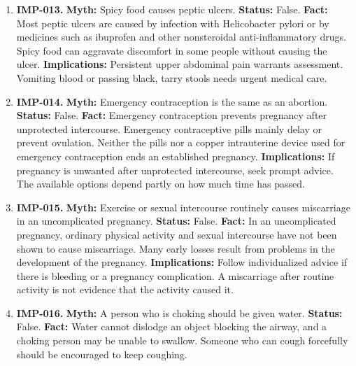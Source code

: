 \documentclass[11pt,oneside]{book}
\begin{document}
\begin{enumerate}[leftmargin=0pt,labelwidth=0pt,labelsep=0pt,itemindent=0pt]
\textbf{Implications:} Consider therapy when distress affects everyday life or when structured support could help you work toward a specific goal.
\item[] \textbf{IMP-013.} \textbf{Myth:} Spicy food causes peptic ulcers.\newline
\textbf{Status:} False.\newline
\textbf{Fact:} Most peptic ulcers are caused by infection with Helicobacter pylori or by medicines such as ibuprofen and other nonsteroidal anti-inflammatory drugs. Spicy food can aggravate discomfort in some people without causing the ulcer. \cite{ref401}\newline
\textbf{Implications:} Persistent upper abdominal pain warrants assessment. Vomiting blood or passing black, tarry stools needs urgent medical care.
\item[] \textbf{IMP-014.} \textbf{Myth:} Emergency contraception is the same as an abortion.\newline
\textbf{Status:} False.\newline
\textbf{Fact:} Emergency contraception prevents pregnancy after unprotected intercourse. Emergency contraceptive pills mainly delay or prevent ovulation. Neither the pills nor a copper intrauterine device used for emergency contraception ends an established pregnancy. \cite{ref402}\newline
\textbf{Implications:} If pregnancy is unwanted after unprotected intercourse, seek prompt advice. The available options depend partly on how much time has passed.
\item[] \textbf{IMP-015.} \textbf{Myth:} Exercise or sexual intercourse routinely causes miscarriage in an uncomplicated pregnancy.\newline
\textbf{Status:} False.\newline
\textbf{Fact:} In an uncomplicated pregnancy, ordinary physical activity and sexual intercourse have not been shown to cause miscarriage. Many early losses result from problems in the development of the pregnancy. \cite{ref254,ref403}\newline
\textbf{Implications:} Follow individualized advice if there is bleeding or a pregnancy complication. A miscarriage after routine activity is not evidence that the activity caused it.
\item[] \textbf{IMP-016.} \textbf{Myth:} A person who is choking should be given water.\newline
\textbf{Status:} False.\newline
\textbf{Fact:} Water cannot dislodge an object blocking the airway, and a choking person may be unable to swallow. Someone who can cough forcefully should be encouraged to keep coughing. \cite{ref404}\newline

\end{enumerate}
\end{document}
